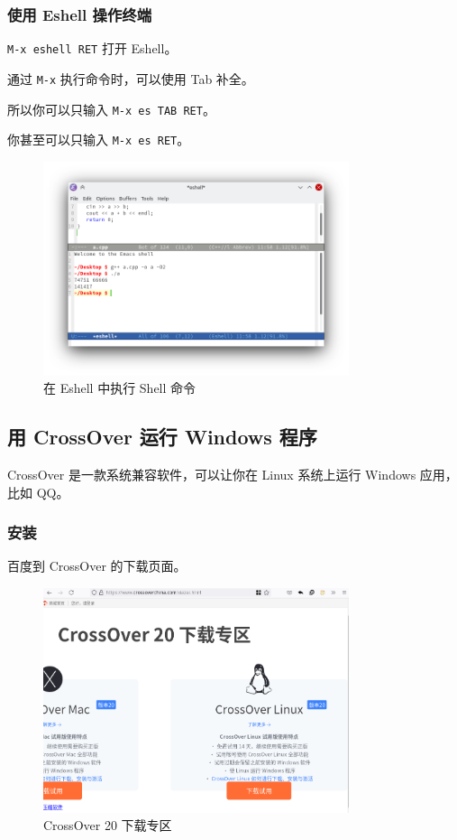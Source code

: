 \documentclass[UTF-8]{ctexart}
\begin{document}
			\subsubsection{使用 Eshell 操作终端}
			
				\texttt{M-x eshell RET} 打开 Eshell。
				
				通过 \texttt{M-x} 执行命令时，可以使用 Tab 补全。
				
				所以你可以只输入 \texttt{M-x es TAB RET}。
				
				你甚至可以只输入 \texttt{M-x es RET}。
				
				\begin{figure}[H]
					\centering
					\includegraphics[width=0.8\textwidth]{fig/emacs_eshall.png}
					\caption*{在 Eshell 中执行 Shell 命令}
				\end{figure}
			
		\newpage
		
		\subsection{用 CrossOver 运行 Windows 程序}
			
			CrossOver 是一款系统兼容软件，可以让你在 Linux 系统上运行 Windows 应用，比如 QQ。
			
			\subsubsection{安装}
				
				百度到 CrossOver 的下载页面。
				
				\begin{figure}[H]
					\centering
					\includegraphics[width=0.8\textwidth]{fig/crossover_download.png}
					\caption*{CrossOver 20 下载专区}
				\end{figure}
				
\end{document}
